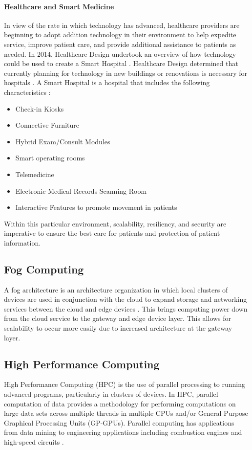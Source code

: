 \documentclass[../main.tex]{subfiles}
\begin{document}
\paragraph{Healthcare and Smart Medicine}
%
In view of the rate in which technology has advanced, healthcare providers are beginning to adopt addition technology in their environment to help expedite service, improve patient care, and provide additional assistance to patients as needed. In 2014, Healthcare Design undertook an overview of how technology could be used to create a Smart Hospital \cite{smart_hospital}. Healthcare Design determined that currently planning for technology in new buildings or renovations is necessary for hospitals \cite{smart_hospital}. A Smart Hospital is a hospital that includes the following characteristics \cite{smart_hospital, shi2011survey}: 
%
\begin{itemize}
    \item Check-in Kiosks
    \item Connective Furniture
    \item Hybrid Exam/Consult Modules
    \item Smart operating rooms
    \item Telemedicine 
    \item Electronic Medical Records Scanning Room
    \item Interactive Features to promote movement in patients
\end{itemize}

Within this particular environment, scalability, resiliency, and security are imperative to ensure the best care for patients and protection of patient information.

\subsection{Fog Computing}

A fog architecture is an architecture organization in which local clusters of devices are used in conjunction with the cloud to expand storage and networking services between the cloud and edge devices \cite{DBLP:conf/aina/PrazeresS16}. This brings computing power down from the cloud service to the gateway and edge device layer. This allows for scalability to occur more easily due to increased architecture at the gateway layer.  


\subsection{High Performance Computing}
%
High Performance Computing (HPC) is the use of parallel processing to running advanced programs, particularly in clusters of devices. In HPC, parallel computation of data provides a methodology for performing computations on large data sets across multiple threads in multiple CPUs and/or General Purpose Graphical Processing Units (GP-GPUs). Parallel computing has applications from data mining to engineering applications including combustion engines and high-speed circuits \cite{parallel_computing}. 
\end{document}
